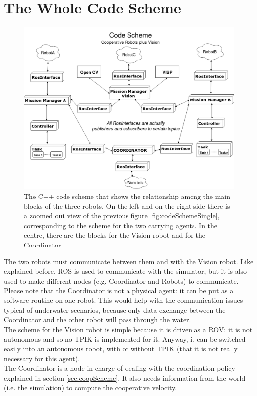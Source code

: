 \section{The Whole Code Scheme}
\begin{figure}[H]
	\begin{center}
		\includegraphics[width=1\columnwidth]{CodeScheme.png}
		\caption[C++ code scheme for the whole architecture]{The C++ code scheme that shows the relationship among the main blocks of the three robots. On the left and on the right side there is a zoomed out view of the previous figure \ref{fig:codeSchemeSingle}, corresponding to the scheme for the two carrying agents. In the centre, there are the blocks for the Vision robot and for the Coordinator.}
		\label{fig:codeSchemeWhole}
	\end{center}
\end{figure}
	
The two robots must communicate between them and with the Vision robot. Like explained before, ROS is used to communicate with the simulator, but it is also used to make different nodes (e.g. Coordinator and Robots) to communicate.\\
Please note that the Coordinator is not a physical agent: it can be put as a software routine on one robot. This would help with the communication issues typical of underwater scenarios, because only data-exchange between the Coordinator and the other robot will pass through the water.\\
The scheme for the Vision robot is simple because it is driven as a ROV: it is not autonomous and so no TPIK is implemented for it. Anyway, it can be switched easily into an autonomous robot, with or without TPIK (that it is not really necessary for this agent).\\
The Coordinator is a node in charge of dealing with the coordination policy explained in section \ref{sec:coopScheme}. It also needs information from the world (i.e. the simulation) to compute the cooperative velocity.
